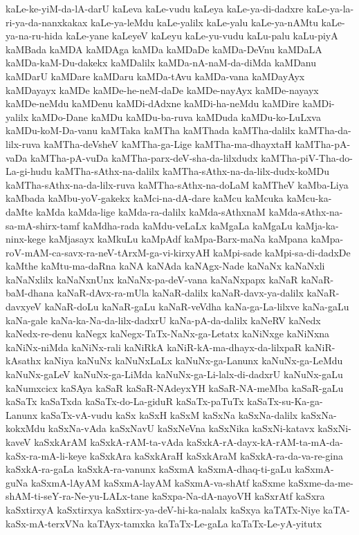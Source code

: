 {kaLe-ke-yiM-da-lA-darU
kaLeva
kaLe-vudu
kaLeya
kaLe-ya-di-dadxre
kaLe-ya-la-ri-ya-da-nanxkakax
kaLe-ya-leMdu
kaLe-yalilx
kaLe-yalu
kaLe-ya-nAMtu
kaLe-ya-na-ru-hida
kaLe-yane
kaLeyeV
kaLeyu
kaLe-yu-vudu
kaLu-palu
kaLu-piyA
kaMBada
kaMDA
kaMDAga
kaMDa
kaMDaDe
kaMDa-DeVnu
kaMDaLA
kaMDa-kaM-Du-dakekx
kaMDalilx
kaMDa-nA-naM-da-diMda
kaMDanu
kaMDarU
kaMDare
kaMDaru
kaMDa-tAvu
kaMDa-vana
kaMDayAyx
kaMDayayx
kaMDe
kaMDe-he-neM-daDe
kaMDe-nayAyx
kaMDe-nayayx
kaMDe-neMdu
kaMDenu
kaMDi-dAdxne
kaMDi-ha-neMdu
kaMDire
kaMDi-yalilx
kaMDo-Dane
kaMDu
kaMDu-ba-ruva
kaMDuda
kaMDu-ko-LuLxva
kaMDu-koM-Da-vanu
kaMTaka
kaMTha
kaMThada
kaMTha-dalilx
kaMTha-da-lilx-ruva
kaMTha-deVsheV
kaMTha-ga-Lige
kaMTha-ma-dhayxtaH
kaMTha-pA-vaDa
kaMTha-pA-vuDa
kaMTha-parx-deV-sha-da-lilxdudx
kaMTha-piV-Tha-do-La-gi-hudu
kaMTha-sAthx-na-dalilx
kaMTha-sAthx-na-da-lilx-dudx-koMDu
kaMTha-sAthx-na-da-lilx-ruva
kaMTha-sAthx-na-doLaM
kaMTheV
kaMba-Liya
kaMbada
kaMbu-yoV-gakekx
kaMci-na-dA-dare
kaMcu
kaMcuka
kaMcu-ka-daMte
kaMda
kaMda-lige
kaMda-ra-dalilx
kaMda-sAthxnaM
kaMda-sAthx-na-sa-mA-shirx-tamf
kaMdha-rada
kaMdu-veLaLx
kaMgaLa
kaMgaLu
kaMja-ka-ninx-kege
kaMjasayx
kaMkuLu
kaMpAdf
kaMpa-Barx-maNa
kaMpana
kaMpa-roV-mAM-ca-savx-ra-neV-tArxM-ga-vi-kirxyAH
kaMpi-sade
kaMpi-sa-di-dadxDe
kaMthe
kaMtu-ma-daRna
kaNA
kaNAda
kaNAgx-Nade
kaNaNx
kaNaNxli
kaNaNxlilx
kaNaNxnUnx
kaNaNx-pa-deV-vana
kaNaNxpapx
kaNaR
kaNaR-baM-dhana
kaNaR-dAvx-ra-mUla
kaNaR-dalilx
kaNaR-davx-ya-dalilx
kaNaR-davxyeV
kaNaR-doLu
kaNaR-gaLu
kaNaR-veVdha
kaNa-ga-La-lilxve
kaNa-gaLu
kaNa-gale
kaNa-ka-Na-da-lilx-dadxrU
kaNa-pA-da-dalilx
kaNeRV
kaNedx
kaNedx-re-denu
kaNegx
kaNegx-TaTx-NaNx-ga-Letatx
kaNiNxge
kaNiNxna
kaNiNx-niMda
kaNiNx-rali
kaNiRkA
kaNiR-kA-ma-dhayx-da-lilxpaR
kaNiR-kAsathx
kaNiya
kaNuNx
kaNuNxLaLx
kaNuNx-ga-Lanunx
kaNuNx-ga-LeMdu
kaNuNx-gaLeV
kaNuNx-ga-LiMda
kaNuNx-ga-Li-lalx-di-dadxrU
kaNuNx-gaLu
kaNumxcicx
kaSAya
kaSaR
kaSaR-NAdeyxYH
kaSaR-NA-meMba
kaSaR-gaLu
kaSaTx
kaSaTxda
kaSaTx-do-La-giduR
kaSaTx-paTuTx
kaSaTx-su-Ka-ga-Lanunx
kaSaTx-vA-vudu
kaSx
kaSxH
kaSxM
kaSxNa
kaSxNa-dalilx
kaSxNa-kokxMdu
kaSxNa-vAda
kaSxNavU
kaSxNeVna
kaSxNika
kaSxNi-katavx
kaSxNi-kaveV
kaSxkArAM
kaSxkA-rAM-ta-vAda
kaSxkA-rA-dayx-kA-rAM-ta-mA-da-kaSx-ra-mA-li-keye
kaSxkAra
kaSxkAraH
kaSxkAraM
kaSxkA-ra-da-va-re-gina
kaSxkA-ra-gaLa
kaSxkA-ra-vanunx
kaSxmA
kaSxmA-dhaq-ti-gaLu
kaSxmA-guNa
kaSxmA-lAyAM
kaSxmA-layAM
kaSxmA-va-shAtf
kaSxme
kaSxme-da-me-shAM-ti-seY-ra-Ne-yu-LALx-tane
kaSxpa-Na-dA-nayoVH
kaSxrAtf
kaSxra
kaSxtirxyA
kaSxtirxya
kaSxtirx-ya-deV-hi-ka-nalalx
kaSxya
kaTATx-Niye
kaTA-kaSx-mA-terxVNa
kaTAyx-tamxka
kaTaTx-Le-gaLa
kaTaTx-Le-yA-yitutx
}
